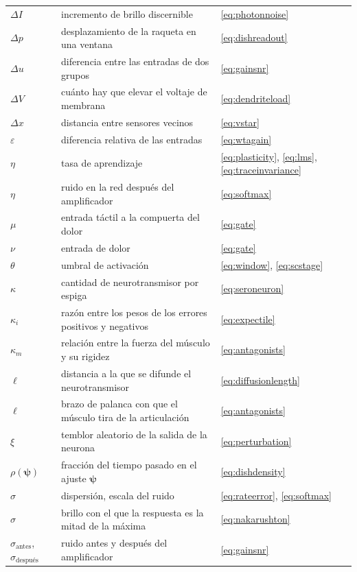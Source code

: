 \begin{center}
\begin{longtable}{>{\raggedright}p{2.0cm}>{\raggedright}p{9.6cm}>{\raggedright\arraybackslash}p{2.4cm}}
$\Delta I$ & incremento de brillo discernible & \eqref{eq:photonnoise} \\
$\Delta p$ & desplazamiento de la raqueta en una ventana & \eqref{eq:dishreadout} \\
$\Delta u$ & diferencia entre las entradas de dos grupos & \eqref{eq:gainsnr} \\
$\Delta V$ & cuánto hay que elevar el voltaje de membrana & \eqref{eq:dendriteload} \\
$\Delta x$ & distancia entre sensores vecinos & \eqref{eq:vstar} \\
$\varepsilon$ & diferencia relativa de las entradas & \eqref{eq:wtagain} \\
$\eta$ & tasa de aprendizaje & \eqref{eq:plasticity}, \eqref{eq:lms}, \eqref{eq:traceinvariance} \\
$\eta$ & ruido en la red después del amplificador & \eqref{eq:softmax} \\
$\mu$ & entrada táctil a la compuerta del dolor & \eqref{eq:gate} \\
$\nu$ & entrada de dolor & \eqref{eq:gate} \\
$\theta$ & umbral de activación & \eqref{eq:window}, \eqref{eq:scstage} \\
$\kappa$ & cantidad de neurotransmisor por espiga & \eqref{eq:seroneuron} \\
$\kappa_i$ & razón entre los pesos de los errores positivos y negativos & \eqref{eq:expectile} \\
$\kappa_m$ & relación entre la fuerza del músculo y su rigidez & \eqref{eq:antagonists} \\
$\ell$ & distancia a la que se difunde el neurotransmisor & \eqref{eq:diffusionlength} \\
$\ell$ & brazo de palanca con que el músculo tira de la articulación & \eqref{eq:antagonists} \\
$\xi$ & temblor aleatorio de la salida de la neurona & \eqref{eq:perturbation} \\
$\rho(\boldsymbol\psi)$ & fracción del tiempo pasado en el ajuste $\boldsymbol\psi$ & \eqref{eq:dishdensity} \\
$\sigma$ & dispersión, escala del ruido & \eqref{eq:rateerror}, \eqref{eq:softmax} \\
$\sigma$ & brillo con el que la respuesta es la mitad de la máxima & \eqref{eq:nakarushton} \\
$\sigma_{\text{antes}}$, $\sigma_{\text{después}}$ & ruido antes y después del amplificador & \eqref{eq:gainsnr} \\

\end{longtable}
\end{center}
